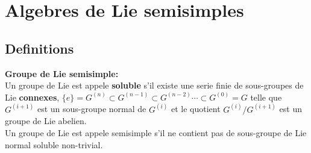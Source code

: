 \section{Algebres de Lie  semisimples}
\subsection{Definitions}

\begin{ddd}{\bf Groupe de Lie  semisimple:}\\
Un groupe de Lie est appele {\bf soluble} s'il existe une serie finie de sous-groupes de Lie {\bf connexes}, 
$\{e\} =G^{(n)} \subset G^{(n-1)} \subset G^{(n-2)} \cdots \subset G^{(0)}=G$
telle que $G^{(i+1)}$ est un sous-groupe normal de $G^{(i)}$ et le quotient $G^{(i)}/G^{(i+1)}$ 
est un groupe de Lie abelien. \\
Un groupe de Lie est appele  semisimple s'il ne contient pas de sous-groupe de Lie normal soluble non-trivial.
\end{ddd}


